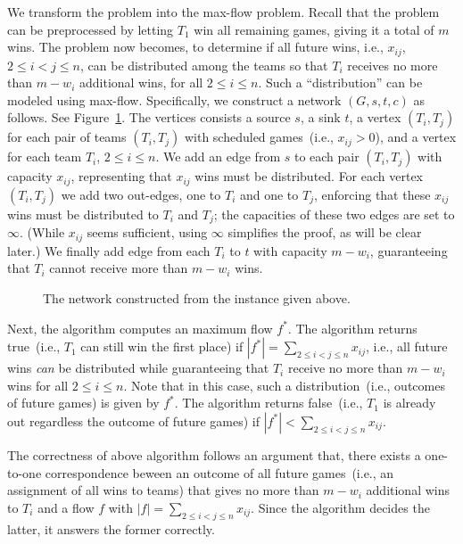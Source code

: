 We transform the problem into the max-flow problem.
Recall that the problem can be preprocessed by letting $T_1$ win all remaining games,
giving it a total of $m$ wins.
The problem now becomes, to determine if all future wins, i.e., $x_{ij}$, $2\le i < j \le n$,
can be distributed among the teams so that $T_i$ receives no more than $m-w_i$ additional wins, for all $2 \le i \le n$.
Such a ``distribution'' can be modeled using max-flow.
Specifically, we construct a network $(G, s, t, c)$ as follows.
See Figure~\ref{fig:baseball}.
The vertices consists a source $s$, a sink $t$,
a vertex $(T_i,T_j)$ for each pair of teams $(T_i, T_j)$ with scheduled games~(i.e., $x_{ij} > 0$),
and a vertex for each team $T_i$, $2 \le i \le n$.
We add an edge from $s$ to each pair $(T_i,T_j)$ with capacity $x_{ij}$, representing that $x_{ij}$ wins must be distributed.
For each vertex $(T_i, T_j)$ we add two out-edges, one to $T_i$ and one to $T_j$, enforcing that these $x_{ij}$ wins must be distributed
to $T_i$ and $T_j$; the capacities of these two edges are set to $\infty$.
(While $x_{ij}$ seems sufficient,
using $\infty$ simplifies the proof, as will be clear later.)
We finally add edge from each $T_i$ to $t$ with capacity $m-w_i$, guaranteeing that $T_i$ cannot receive more than $m-w_i$ wins.

\begin{figure}[!h]
\centering{}
\caption{The network constructed from the instance given above.}
\label{fig:baseball}
\end{figure}

Next, the algorithm computes an maximum flow $f^*$.
The algorithm returns true~(i.e., $T_1$ can still win the first place)
if $|f^*| = \sum_{2\le i< j \le n} x_{ij}$, i.e., all future wins
\emph{can} be distributed while guaranteeing that $T_i$ receive no 
more than $m-w_i$ wins for all $2\le i \le n$. Note that
in this case, such a distribution~(i.e., outcomes of future games)
is given by $f^*$. The algorithm returns false~(i.e., $T_1$ is already out
regardless the outcome of future games) if $|f^*| < \sum_{2\le i< j \le n} x_{ij}$.

The correctness of above algorithm follows an argument that,
there exists a one-to-one correspondence beween
an outcome of all future games~(i.e., an assignment of all wins to teams)
that gives no more than $m-w_i$ additional wins to $T_i$
and a flow $f$ with $|f| = \sum_{2\le i < j \le n} x_{ij}$.
Since the algorithm decides the latter, it answers the former correctly.



